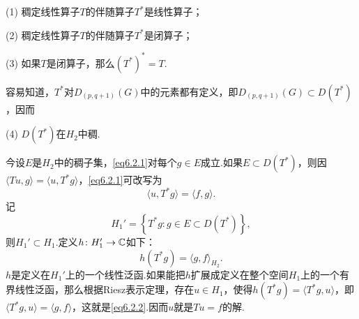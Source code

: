 (1)
稠定线性算子$T$的伴随算子$T^\ast$是线性算子；

(2)
稠定线性算子$T$的伴随算子$T^\ast$是闭算子；

(3)
如果$T$是闭算子，那么$(T^\ast)^\ast=T$.

容易知道，$T^\ast$对$D_{(p,q+1)}(G)$中的元素都有定义，即$D_{(p,q+1)}(G)\subset D(T^\ast)$，因而

(4)
$D(T^\ast)$在$H_2$中稠.

今设$E$是$H_2$中的稠子集，\eqref{eq6.2.1}对每个$g\in E$成立.如果$E\subset D(T^\ast)$，则因$\langle Tu,g\rangle=\langle u,T^\ast g\rangle$，\eqref{eq6.2.1}可改写为
\begin{equation}\label{eq6.2.2}
	\langle u,T^\ast g\rangle=\langle f,g\rangle.
\end{equation}
记
\[H_1'=\left\{T^\ast g\colon g\in E\subset D(T^\ast)\right\},\]
则$H_1'\subset H_1$.定义$h\colon H_1'\to \mathbb C$如下：
\[h(T^\ast g)=\langle g,f\rangle_{H_2}.\]
$h$是定义在$H_1'$上的一个线性泛函.如果能把$h$扩展成定义在整个空间$H_1$上的一个有界线性泛函，那么根据Riesz表示定理，存在$u\in H_1$，使得$h(T^\ast g)=\langle T^\ast g,u\rangle$，即$\langle T^\ast g,u\rangle=\langle g,f\rangle$，这就是\eqref{eq6.2.2}.因而$u$就是$Tu=f$的解.

